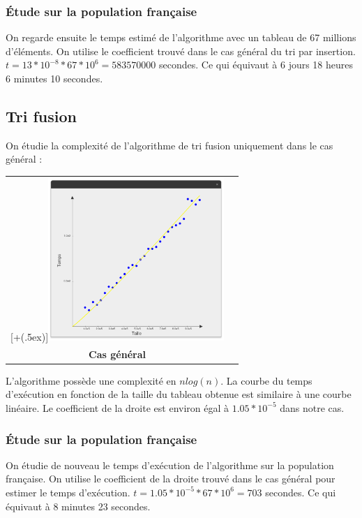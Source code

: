 \documentclass[12pt]{article}
\newcommand*{\addheight}[2][.5ex]{%
  \raisebox{0pt}[\dimexpr\height+(#1)\relax]{#2}%
}
\begin{document}
\subsubsection*{Étude sur la population française}

On regarde ensuite le temps estimé de l'algorithme avec un tableau de 67 millions d'éléments.
On utilise le coefficient trouvé dans le cas général du tri par insertion.
$ t = 13*10^{-8} * 67*10^6 = 583570000 $ secondes. Ce qui équivaut à 6 jours 18 heures 6 minutes 10 secondes.

\subsection{Tri fusion}

On étudie la complexité de l'algorithme de tri fusion uniquement dans le cas général :

\begin{tabular}[H]{c c}
    \addheight{\includegraphics[width=18em]{fus_gen.png}}  & \\
    \small \textbf{Cas général} & \\
\end{tabular}

L'algorithme possède une complexité en $n log(n)$. La courbe du temps d'exécution en fonction de la taille du tableau obtenue est similaire à une courbe linéaire.
Le coefficient de la droite est environ égal à $1.05*10^{-5}$ dans notre cas.

\subsubsection*{Étude sur la population française}

On étudie de nouveau le temps d'exécution de l'algorithme sur la population française.
On utilise le coefficient de la droite trouvé dans le cas général pour estimer le temps d'exécution. $ t = 1.05*10^{-5} * 67*10^6 = 703 $ secondes. Ce qui équivaut à 8 minutes 23 secondes.
\end{document}
